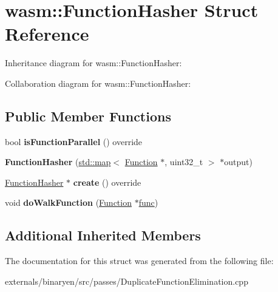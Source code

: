 \hypertarget{structwasm_1_1_function_hasher}{}\section{wasm\+:\+:Function\+Hasher Struct Reference}
\label{structwasm_1_1_function_hasher}


Inheritance diagram for wasm\+:\+:Function\+Hasher\+:


Collaboration diagram for wasm\+:\+:Function\+Hasher\+:
\subsection*{Public Member Functions}
\begin{DoxyCompactItemize}
\item 
\mbox{\label{structwasm_1_1_function_hasher_a2aec1ada74ecdc88a0fda74640799052}} 
bool {\bfseries is\+Function\+Parallel} () override
\item 
\mbox{\label{structwasm_1_1_function_hasher_a4b11e8db1f204d2668b18771cdfba466}} 
{\bfseries Function\+Hasher} (\mbox{\hyperlink{classstd_1_1map}{std\+::map}}$<$ \mbox{\hyperlink{classwasm_1_1_function}{Function}} $\ast$, uint32\+\_\+t $>$ $\ast$output)
\item 
\mbox{\label{structwasm_1_1_function_hasher_a8ef49cfbcac9fd4da2ec0320eb950f96}} 
\mbox{\hyperlink{structwasm_1_1_function_hasher}{Function\+Hasher}} $\ast$ {\bfseries create} () override
\item 
\mbox{\label{structwasm_1_1_function_hasher_a8ee97b879755909b401d27e0c64bd0f5}} 
void {\bfseries do\+Walk\+Function} (\mbox{\hyperlink{classwasm_1_1_function}{Function}} $\ast$\mbox{\hyperlink{structfunc}{func}})
\end{DoxyCompactItemize}
\subsection*{Additional Inherited Members}


The documentation for this struct was generated from the following file\+:\begin{DoxyCompactItemize}
\item 
externals/binaryen/src/passes/Duplicate\+Function\+Elimination.\+cpp\end{DoxyCompactItemize}
